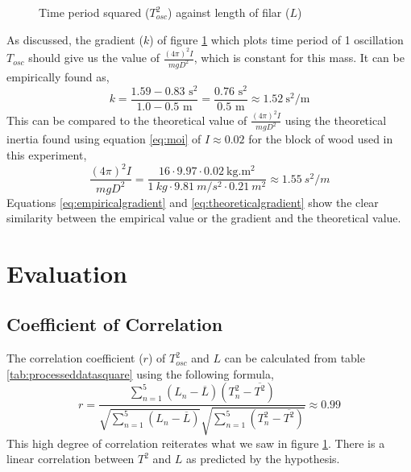 \documentclass[a4paper,12pt]{article}
\theoremstyle{definition}
\begin{document}
\begin{figure}[H]
\centering
{}
\caption{Time period squared ($T_{osc}^2$) against length of filar ($L$)}
\label{fig:correlation2}
\end{figure}

As discussed, the gradient ($k$) of figure \ref{fig:correlation2} which plots time period of 1 oscillation $T_{osc}$ should give us the value of $\frac{(4 \pi)^2 I}{mgD^2}$, which is constant for this mass. It can be empirically found as, 
\begin{equation}\label{eq:empiricalgradient}
	k = \frac{1.59-0.83 \text{ s}^2}{1.0-0.5 \text{ m}} = \frac{0.76 \text{ s}^2}{0.5 \text{ m}} \approx \SI{1.52}{\second^2\per\metre} 
\end{equation}
This can be compared to the theoretical value of $\frac{(4 \pi)^2 I}{mgD^2}$ using the theoretical inertia found using equation \ref{eq:moi} of $I \approx 0.02$ for the block of wood used in this experiment,
\begin{equation}\label{eq:theoreticalgradient}
	\frac{(4 \pi)^2 I}{mgD^2} = \frac{16 \cdot 9.97 \cdot \SI{0.02}{\kilogram.\metre^2}}{\SI{1}{kg} \cdot \SI{9.81}{m/s^2} \cdot \SI{0.21}{m^2}} \approx \SI{1.55}{s^2/m}
\end{equation}
Equations \ref{eq:empiricalgradient} and \ref{eq:theoreticalgradient} show the clear similarity between the empirical value or the gradient and the theoretical value.


\section{Evaluation}
\subsection{Coefficient of Correlation}
The correlation coefficient ($r$) of $T^{2}_{osc}$ and $L$ can be calculated from table \ref{tab:processeddatasquare} using the following formula,
\begin{equation}
	r=\frac{\sum\limits_{n=1}^{5}(L_n-\overline{L})(T^2_n-\overline{T^2})}{\sqrt{\sum\limits_{n=1}^{5}(L_n-\overline{L})}\sqrt{\sum\limits_{n=1}^{5}(T^2_n-\overline{T^2})}} \approx 0.99
\end{equation}
This high degree of correlation reiterates what we saw in figure  \ref{fig:correlation2}. There is a linear correlation between $T^2$ and $L$ as predicted by the hypothesis.
\end{document}
